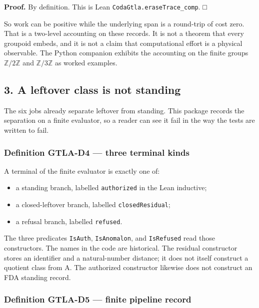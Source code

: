 \documentclass[
  11pt,
]{article}
\providecommand{\tightlist}{%
  \setlength{\itemsep}{0pt}\setlength{\parskip}{0pt}}
\begin{document}
\textbf{Proof.} By definition. This is Lean \nolinkurl{CodaGtla.eraseTrace_comp}. □

So work can be positive while the underlying span is a round-trip of cost zero. That is a two-level accounting on these records. It is not a theorem that every groupoid embeds, and it is not a claim that computational effort is a physical observable. The Python companion exhibits the accounting on the finite groups \(\mathbb{Z}/2\mathbb{Z}\) and \(\mathbb{Z}/3\mathbb{Z}\) as worked examples.

\subsection{3. A leftover class is not standing}\label{a-leftover-class-is-not-standing}

The six jobs already separate leftover from standing. This package records the separation on a finite evaluator, so a reader can see it fail in the way the tests are written to fail.

\subsubsection{Definition GTLA-D4 --- three terminal kinds}\label{definition-gtla-d4-three-terminal-kinds}

A terminal of the finite evaluator is exactly one of:

\begin{itemize}
\tightlist
\item
  a standing branch, labelled \texttt{authorized} in the Lean inductive;
\item
  a closed-leftover branch, labelled \texttt{closedResidual};
\item
  a refusal branch, labelled \texttt{refused}.
\end{itemize}

The three predicates \texttt{IsAuth}, \texttt{IsAnomalon}, and \texttt{IsRefused} read those constructors. The names in the code are historical. The residual constructor stores an identifier and a natural-number distance; it does not itself construct a quotient class from A. The authorized constructor likewise does not construct an FDA standing record.

\subsubsection{Definition GTLA-D5 --- finite pipeline record}\label{definition-gtla-d5-finite-pipeline-record}
\end{document}
